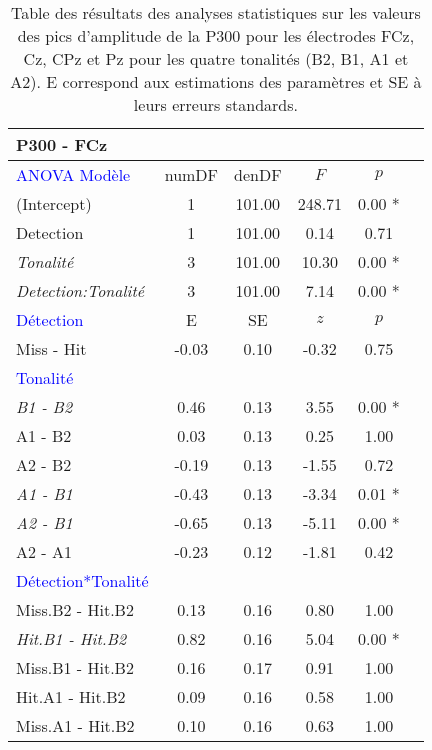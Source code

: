 \begin{landscape}
\begin{table}
\centering
\tiny
\caption[Table des résultats des analyses statistiques de la P300 pour les électrodes FCz, Cz, CPz et Pz]{Table des résultats des analyses statistiques sur les valeurs des pics d'amplitude de la P300 pour les électrodes FCz, Cz, CPz et Pz pour les quatre tonalités (B2, B1, A1 et A2). E correspond aux estimations des paramètres et SE à leurs erreurs standards.}
\label{tab:table5statsP300}
\begin{multicols}{4}
\begin{tabular}{|l|*{5}{c|}}
\hline
\textbf{P300 - FCz} & & & & \\
\hline
\textcolor{blue}{ANOVA Modèle} & numDF & denDF & $F$ & $p$ \\ 
\hline
(Intercept) & 1 & 101.00 & 248.71 & 0.00 * \\ 
Detection & 1 & 101.00 & 0.14 & 0.71 \\ 
\textit{Tonalité} & 3 & 101.00 & 10.30 & 0.00 * \\ 
\textit{Detection:Tonalité} & 3 & 101.00 & 7.14 & 0.00 * \\ 
\hline
\textcolor{blue}{Détection} & E & SE & $z$ & $p$ \\ 
\hline
Miss - Hit & -0.03 & 0.10 & -0.32 & 0.75 \\ 
\hline
\textcolor{blue}{Tonalité} & & & & \\ 
\hline
\textit{B1 - B2} & 0.46 & 0.13 & 3.55 & 0.00 * \\ 
A1 - B2 & 0.03 & 0.13 & 0.25 & 1.00 \\ 
A2 - B2 & -0.19 & 0.13 & -1.55 & 0.72 \\ 
\textit{A1 - B1} & -0.43 & 0.13 & -3.34 & 0.01 * \\ 
\textit{A2 - B1} & -0.65 & 0.13 & -5.11 & 0.00 * \\ 
A2 - A1 & -0.23 & 0.12 & -1.81 & 0.42 \\ 
\hline
\textcolor{blue}{Détection*Tonalité} & & & & \\ 
\hline
Miss.B2 - Hit.B2 & 0.13 & 0.16 & 0.80 & 1.00 \\ 
\textit{Hit.B1 - Hit.B2} & 0.82 & 0.16 & 5.04 & 0.00 * \\ 
Miss.B1 - Hit.B2 & 0.16 & 0.17 & 0.91 & 1.00 \\ 
Hit.A1 - Hit.B2 & 0.09 & 0.16 & 0.58 & 1.00 \\ 
Miss.A1 - Hit.B2 & 0.10 & 0.16 & 0.63 & 1.00 \\ 

\end{tabular}
\end{multicols}
\end{table}
\end{landscape}
